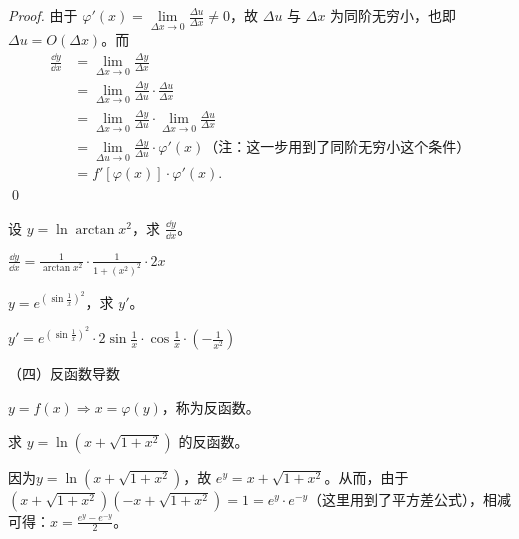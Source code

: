     \begin{proof}
        由于 $\varphi'(x)=\lim\limits_{\Delta x \to 0}\displaystyle\frac{\Delta u}{\Delta x}\neq 0$，故 $\Delta u$ 与 $\Delta x$ 为同阶无穷小，也即 $\Delta u = O(\Delta x)$。而 
        \begin{align*}
        \displaystyle\frac{\dd{y}}{\dd{x}} &= \lim\limits_{\Delta x \to 0}\displaystyle\frac{\Delta y}{\Delta x}\\
        &=\lim\limits_{\Delta x \to 0}\displaystyle\frac{\Delta y}{\Delta u} \cdot \displaystyle\frac{\Delta u}{\Delta x}\\
        &=\lim\limits_{\Delta x \to 0}\displaystyle\frac{\Delta y}{\Delta u} \cdot \lim\limits_{\Delta x \to 0}\displaystyle\frac{\Delta u}{\Delta x}\\
        &=\lim\limits_{\Delta u \to 0}\displaystyle\frac{\Delta y}{\Delta u} \cdot \varphi'(x) \text{（注：这一步用到了同阶无穷小这个条件）}\\
        &=f'[\varphi(x)]\cdot\varphi'(x). 
        \end{align*}
        \qed
    \end{proof}

    \begin{example}
        设 $y = \ln\arctan x^2$，求 $\displaystyle\frac{\dd{y}}{\dd{x}}$。
    \end{example}

    \begin{solution}
        $\displaystyle\frac{\dd{y}}{\dd{x}} = \displaystyle\frac{1}{\arctan x^2}\cdot \displaystyle\frac{1}{1+(x^2)^2}\cdot 2x$
    \end{solution}

    \begin{example}
        $ y = e^{(\sin{\frac{1}{x}})^2}$，求 $y'$。
    \end{example}

    \begin{solution}
        $ y' = e^{(\sin{\frac{1}{x}})^2}\cdot 2\sin{\frac{1}{x}}\cdot \cos{\frac{1}{x}} \cdot (-\frac{1}{x^2})$
    \end{solution}

    （四）反函数导数
    
    $ y = f(x) \Rightarrow  x = \varphi(y)$，称为反函数。
    \begin{example}
        求 $ y=\ln{(x+\sqrt{1+x^2})} $ 的反函数。
    \end{example}

    \begin{solution}
        因为$ y=\ln{(x+\sqrt{1+x^2})} $，故 $e^y = x+\sqrt{1+x^2}$。从而，由于 $(x+\sqrt{1+x^2})(-x+\sqrt{1+x^2})=1=e^y\cdot e^{-y}$（这里用到了平方差公式），相减可得：$x=\displaystyle\frac{e^y-e^{-y}}{2}$。
    \end{solution}

